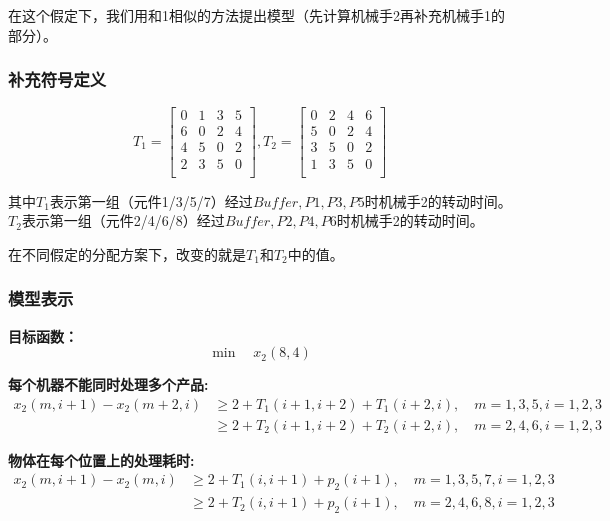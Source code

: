 \documentclass{ctexart}
\begin{document}
{{        在这个假定下，我们用和1相似的方法提出模型（先计算机械手2再补充机械手1的部分）。
        
        \subsubsection{补充符号定义}
        {
        	$$
        	T_1=\begin{bmatrix}
        	0 & 1 & 3 & 5 \\
        	6 & 0 & 2 & 4 \\
        	4 & 5 & 0 & 2 \\
        	2 & 3 & 5 & 0 \\
        	\end{bmatrix}, T_2=\begin{bmatrix}
        	0 & 2 & 4 & 6 \\
        	5 & 0 & 2 & 4 \\
        	3 & 5 & 0 & 2 \\
        	1& 3 & 5 & 0 \\
        	\end{bmatrix}
        	$$
        	
        	其中$T_1$表示第一组（元件1/3/5/7）经过$Buffer,P1,P3,P5$时机械手2的转动时间。$T_2$表示第一组（元件2/4/6/8）经过$Buffer,P2,P4,P6$时机械手2的转动时间。
        	
        	在不同假定的分配方案下，改变的就是$T_1$和$T_2$中的值。
        }
    
    	\subsubsection{模型表示}
    	{
        
        \textbf{目标函数：}
        $$
        \min \quad x_2(8,4)
        $$
        
        \vspace{10pt}
        
        \textbf{每个机器不能同时处理多个产品:}
        $$
        \begin{aligned}
        	x_2(m,i+1)-x_2(m+2,i) &\ge 2+T_1(i+1,i+2)+T_1(i+2,i),\quad m=1,3,5, i=1,2,3 \\
        	&\ge 2+T_2(i+1,i+2)+T_2(i+2,i),  \quad m=2,4,6, i=1,2,3
        \end{aligned}
        $$
        
        \vspace{10pt}
        
        \textbf{物体在每个位置上的处理耗时:}
        $$
        \begin{aligned}
        x_2(m,i+1) - x_2(m,i) &\ge 2+T_1(i,i+1)+p_2(i+1),\quad m=1,3,5,7, i=1,2,3 \\
        &\ge 2+T_2(i,i+1)+p_2(i+1),  \quad m=2,4,6,8, i=1,2,3
        \end{aligned}
        $$
        
}}}
\end{document}
